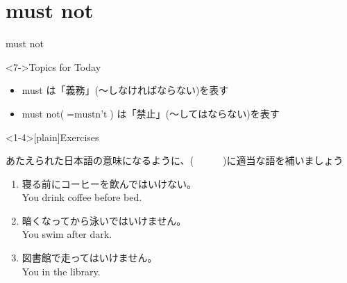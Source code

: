 \documentclass[aspectratio=169,xcolor={dvipsnames,table}]{beamer}
\newcommand{\myaudio}[1]{\href{#1}{\faVolumeUp}}
\begin{document}
\section{must not}
\begin{frame}[plain]{must not}
 
\Large


\vspace{-10pt}
\mbox{}\hfill{}



 \hfill{}

\hfill{{\scriptsize \myaudio{./audio/013_must_04.mp3}}}

\vfill

\begin{exampleblock}<7->{Topics for Today}
\begin{itemize}[square]\small
 \item must は「義務」(〜しなければならない)を表す
 \item must not($=\text{mustn't}$) は「禁止」(〜してはならない)を表す
 \end{itemize}
     \end{exampleblock}

\end{frame}
\begin{frame}<1-4>[plain]{Exercises}
 
あたえられた日本語の意味になるように、(~~~~~~)に適当な語を補いましょう
\hfill{\myaudio{./audio/013_must_05.mp3}}


\begin{enumerate}
 \item {\small 寝る前にコーヒーを飲んではいけない。}\\
You  drink coffee before bed.
 \item {\small 暗くなってから泳いではいけません。}\\
 You  swim after dark.
 \item {\small 図書館で走ってはいけません。}\\
 You   in the library.
\end{enumerate}
\end{frame}
\end{document}
